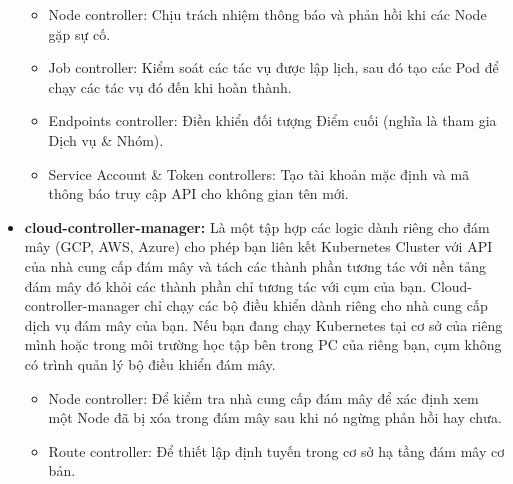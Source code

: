 \documentclass[12pt,a4paper]{report}
\begin{document}
\begin{itemize}
		\hspace{0.8cm}{Một số loại bộ điều khiển có thể kể đến:}
		\begin{itemize}
			\item Node controller: Chịu trách nhiệm thông báo và phản hồi khi các Node gặp sự cố.
			
			\item Job controller: Kiểm soát các tác vụ được lập lịch, sau đó tạo các Pod để chạy các tác vụ đó đến khi hoàn thành.
			
			\item Endpoints controller: Điền khiển đối tượng Điểm cuối (nghĩa là tham gia Dịch vụ \& Nhóm).
			
			\item Service Account \& Token controllers: Tạo tài khoản mặc định và mã thông báo truy cập API cho không gian tên mới.
		\end{itemize}
		
		\item \textbf{cloud-controller-manager:}
		\subitem
		Là một tập hợp các logic dành riêng cho đám mây (GCP, AWS, Azure) cho phép bạn liên kết Kubernetes Cluster với API của nhà cung cấp đám mây và tách các thành phần tương tác với nền tảng đám mây đó khỏi các thành phần chỉ tương tác với cụm của bạn. Cloud-controller-manager chỉ chạy các bộ điều khiển dành riêng cho nhà cung cấp dịch vụ đám mây của bạn. Nếu bạn đang chạy Kubernetes tại cơ sở của riêng mình hoặc trong môi trường học tập bên trong PC của riêng bạn, cụm không có trình quản lý bộ điều khiển đám mây.
		
		\hspace{0.8cm}{Cũng như với kube-controller-manager, cloud-controller-manager kết hợp một số vòng điều khiển độc lập về mặt logic thành một tệp nhị phân duy nhất mà bạn chạy như một quy trình duy nhất. Bạn có thể chia tỷ lệ theo chiều ngang (chạy nhiều hơn một bản sao) để cải thiện hiệu suất hoặc để giúp tăng khả năng chịu lỗi. }
		
		\hspace{0.8cm}{Các bộ điều khiển sau có thể có các phần phụ thuộc của nhà cung cấp dịch vụ đám mây:}
		\begin{itemize}
			\item Node controller: Để kiểm tra nhà cung cấp đám mây để xác định xem một Node đã bị xóa trong đám mây sau khi nó ngừng phản hồi hay chưa.
			
			\item Route controller: Để thiết lập định tuyến trong cơ sở hạ tầng đám mây cơ bản.
			

\end{itemize}
\end{itemize}
\end{document}
